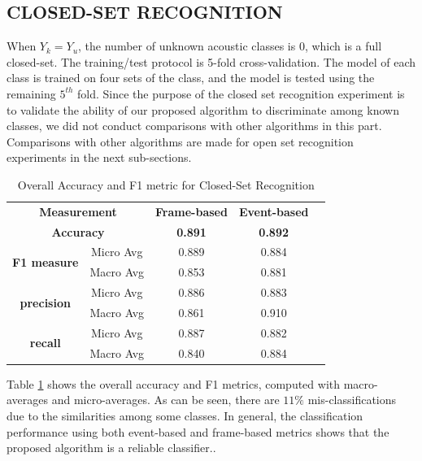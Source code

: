 \documentclass{ieeeaccess}
\begin{document}
\subsection{CLOSED-SET RECOGNITION }
When $ Y_{k}=Y_{u} $,  the number of unknown acoustic classes is 0, which is a full closed-set. The training/test protocol is 5-fold cross-validation. The model of each class is trained on four sets of the class, and the model is tested using the remaining  $ 5^{th} $ fold. Since the purpose of the closed set recognition experiment is to validate the ability of our proposed algorithm to discriminate among known classes, we did not conduct comparisons with other algorithms in this part. Comparisons with other algorithms are made for open set recognition experiments in the next sub-sections.  
\begin{table}
	\caption{Overall Accuracy and F1 metric for Closed-Set Recognition}
	\centering
	\setlength{\tabcolsep}{6pt}
	\begin{tabular}{|c|c|c|c|c}		
		\cline{1-4}
		\multicolumn{2}{|c|}{\textbf{Measurement}}                             & \textbf{Frame-based} & \textbf{Event-based} &  \\ \cline{1-4}
		\multicolumn{2}{|c|}{\textbf{Accuracy}}                                & \textbf{0.891}       & \textbf{0.892}       &  \\ \cline{1-4}
		\multicolumn{1}{|c|}{\multirow{2}{*}{\textbf{F1 measure}}} & Micro Avg & 0.889                & 0.884                &  \\ \cline{2-4}
		\multicolumn{1}{|c|}{}                                     & Macro Avg & 0.853                & 0.881                &  \\ \cline{1-4}
		\multicolumn{1}{|c|}{\multirow{2}{*}{\textbf{precision}}}  & Micro Avg & 0.886                & 0.883                &  \\ \cline{2-4}
		\multicolumn{1}{|c|}{}                                     & Macro Avg & 0.861                & 0.910                &  \\ \cline{1-4}
		\multirow{2}{*}{\textbf{recall}}                           & Micro Avg & 0.887                & 0.882                &  \\ \cline{2-4}
		& Macro Avg & 0.840                & 0.884                &  \\ \cline{1-4}
	\end{tabular}
	\label{tab:table2}
\end{table}
Table \ref{tab:table2} shows the overall accuracy and F1 metrics, computed with macro-averages and micro-averages. As can be seen, there are  $ 11 \% $ mis-classifications due to the similarities among some classes. In general, the classification performance using both event-based and frame-based metrics shows that the proposed algorithm is a reliable classifier..\\
\end{document}
